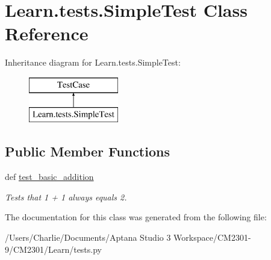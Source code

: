 \hypertarget{class_learn_1_1tests_1_1_simple_test}{\section{Learn.\-tests.\-Simple\-Test Class Reference}
\label{class_learn_1_1tests_1_1_simple_test}
}
Inheritance diagram for Learn.\-tests.\-Simple\-Test\-:\begin{figure}[H]
\begin{center}
\leavevmode
\includegraphics[height=2.000000cm]{class_learn_1_1tests_1_1_simple_test}
\end{center}
\end{figure}
\subsection*{Public Member Functions}
\begin{DoxyCompactItemize}
\item 
\hypertarget{class_learn_1_1tests_1_1_simple_test_a89c70e1c14de8d213e92746d1e0ece06}{def \hyperlink{class_learn_1_1tests_1_1_simple_test_a89c70e1c14de8d213e92746d1e0ece06}{test\-\_\-basic\-\_\-addition}}\label{class_learn_1_1tests_1_1_simple_test_a89c70e1c14de8d213e92746d1e0ece06}

\begin{DoxyCompactList}\small\item\em Tests that 1 + 1 always equals 2. \end{DoxyCompactList}\end{DoxyCompactItemize}


The documentation for this class was generated from the following file\-:\begin{DoxyCompactItemize}
\item 
/\-Users/\-Charlie/\-Documents/\-Aptana Studio 3 Workspace/\-C\-M2301-\/9/\-C\-M2301/\-Learn/tests.\-py\end{DoxyCompactItemize}
